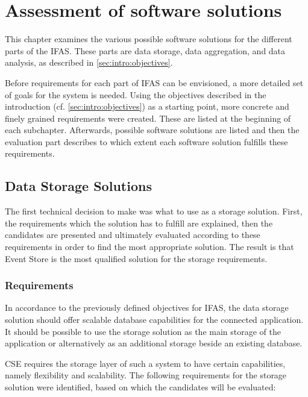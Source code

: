 %
\chapter{Assessment of software solutions}
\label{ch:classifications}

This chapter examines the various possible software solutions for the different parts of the \acf{IFAS}.
These parts are data storage, data aggregation, and data analysis, as described in \cref{sec:intro:objectives}.

Before requirements for each part of \ac{IFAS} can be envisioned, a more detailed set of goals for the system is needed.
Using the objectives described in the introduction (cf. \cref{sec:intro:objectives}) as a starting point, more concrete and finely grained requirements were created.
These are listed at the beginning of each subchapter.
Afterwards, possible software solutions are listed and then the evaluation part describes to which extent each software solution fulfills these requirements.

\section{Data Storage Solutions}
\label{sec:classifications:storage}

The first technical decision to make was what to use as a storage solution.
First, the requirements which the solution has to fulfill are explained, then the candidates are presented and ultimately evaluated according to these requirements in order to find the most appropriate solution.
The result is that Event Store is the most qualified solution for the storage requirements.

\subsection{Requirements}
\label{subsec:classifications:storage:req}

In accordance to the previously defined objectives for \ac{IFAS}, the data storage solution should offer scalable database capabilities for the connected application.
It should be possible to use the storage solution as the main storage of the application or alternatively as an additional storage beside an existing database.

\ac{CSE} requires the storage layer of such a system to have certain capabilities, namely flexibility and scalability.
The following requirements for the storage solution were identified, based on which the candidates will be evaluated:

